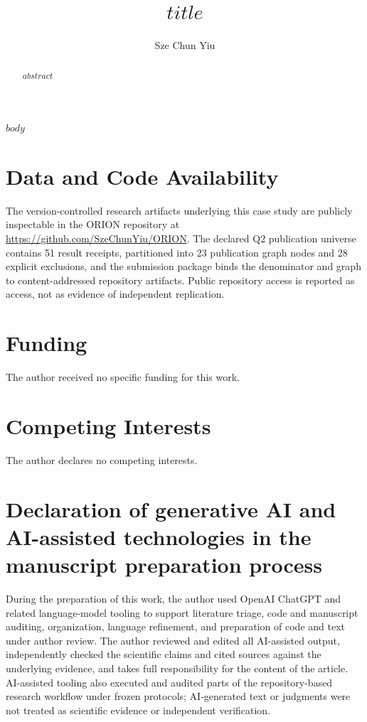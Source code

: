 \documentclass[preprint,12pt]{elsarticle}
\begin{document}
\begin{frontmatter}
\title{$title$}
\author{Sze Chun Yiu}
\address{Stockholm University, Stockholm, Sweden}
\begin{abstract}
$abstract$
\end{abstract}
\end{frontmatter}

$body$

\section*{Data and Code Availability}
The version-controlled research artifacts underlying this case study are publicly
inspectable in the ORION repository at \url{https://github.com/SzeChunYiu/ORION}.
The declared Q2 publication universe contains 51 result receipts, partitioned into
23 publication graph nodes and 28 explicit exclusions, and the submission package
binds the denominator and graph to content-addressed repository artifacts. Public
repository access is reported as access, not as evidence of independent replication.

\section*{Funding}
The author received no specific funding for this work.

\section*{Competing Interests}
The author declares no competing interests.

\section*{Declaration of generative AI and AI-assisted technologies in the manuscript preparation process}
During the preparation of this work, the author used OpenAI ChatGPT and related
language-model tooling to support literature triage, code and manuscript auditing,
organization, language refinement, and preparation of code and text under author
review. The author reviewed and edited all AI-assisted output, independently checked
the scientific claims and cited sources against the underlying evidence, and takes
full responsibility for the content of the article. AI-assisted tooling also executed
and audited parts of the repository-based research workflow under frozen protocols;
AI-generated text or judgments were not treated as scientific evidence or independent
verification.



\end{document}
